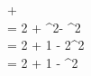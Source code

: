 \theta + \theta \\
= 2 \sin\theta \cos\theta + \cos^{2}\theta - \sin^{2}\theta \\
= 2 \sin\theta \cos\theta + 1 - 2\sin^{2}\theta \\
= 2 \sin\theta \cos\theta + 1 - \sin^{2}\theta
